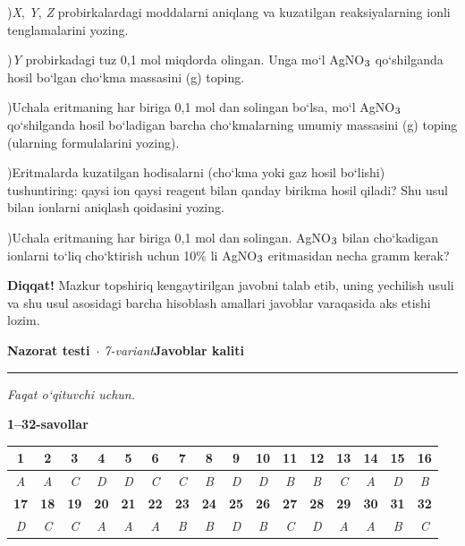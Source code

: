 \documentclass[11pt,a4paper]{article}
\renewcommand{\textsubscript}[1]{\ensuremath{_{\text{\fontsize{8}{8}\selectfont #1}}}}
\newcommand{\diqqat}[1]{\par\smallskip\noindent\textbf{Diqqat!} #1\par\medskip}
\begin{document}
)\textit{X}, \textit{Y}, \textit{Z} probirkalardagi moddalarni aniqlang va kuzatilgan reaksiyalarning ionli tenglamalarini yozing.\par
{})\textit{Y} probirkadagi tuz 0,1 mol miqdorda olingan. Unga mo`l AgNO\textsubscript{3} qo`shilganda hosil bo`lgan cho`kma massasini (g) toping.\par
{})Uchala eritmaning har biriga 0,1 mol dan solingan bo`lsa, mo`l AgNO\textsubscript{3} qo`shilganda hosil bo`ladigan barcha cho`kmalarning umumiy massasini (g) toping (ularning formulalarini yozing).\par
{})Eritmalarda kuzatilgan hodisalarni (cho`kma yoki gaz hosil bo`lishi) tushuntiring: qaysi ion qaysi reagent bilan qanday birikma hosil qiladi? Shu usul bilan ionlarni aniqlash qoidasini yozing.\par
{})Uchala eritmaning har biriga 0,1 mol dan solingan. AgNO\textsubscript{3} bilan cho`kadigan ionlarni to`liq cho`ktirish uchun 10\% li AgNO\textsubscript{3} eritmasidan necha gramm kerak?\par
\diqqat{Mazkur topshiriq kengaytirilgan javobni talab etib, uning yechilish usuli va shu usul asosidagi barcha hisoblash amallari javoblar varaqasida aks etishi lozim.}
\newpage
\noindent\textbf{\fontsize{13}{15}\selectfont Nazorat testi}\ \textit{$\cdot$ 7-variant}\hfill \textbf{Javoblar kaliti}\par\smallskip\hrule\smallskip
\textit{Faqat o`qituvchi uchun.}\par\medskip
\noindent\textbf{1--32-savollar}\par\smallskip
\noindent\begin{tabular}{|c|c|c|c|c|c|c|c|c|c|c|c|c|c|c|c|}\hline
\textbf{1} & \textbf{2} & \textbf{3} & \textbf{4} & \textbf{5} & \textbf{6} & \textbf{7} & \textbf{8} & \textbf{9} & \textbf{10} & \textbf{11} & \textbf{12} & \textbf{13} & \textbf{14} & \textbf{15} & \textbf{16}\\\hline
\textsl{A} & \textsl{A} & \textsl{C} & \textsl{D} & \textsl{D} & \textsl{C} & \textsl{C} & \textsl{B} & \textsl{D} & \textsl{D} & \textsl{B} & \textsl{B} & \textsl{C} & \textsl{A} & \textsl{D} & \textsl{B}\\\hline
\textbf{17} & \textbf{18} & \textbf{19} & \textbf{20} & \textbf{21} & \textbf{22} & \textbf{23} & \textbf{24} & \textbf{25} & \textbf{26} & \textbf{27} & \textbf{28} & \textbf{29} & \textbf{30} & \textbf{31} & \textbf{32}\\\hline
\textsl{D} & \textsl{C} & \textsl{C} & \textsl{A} & \textsl{A} & \textsl{A} & \textsl{B} & \textsl{B} & \textsl{D} & \textsl{B} & \textsl{C} & \textsl{D} & \textsl{A} & \textsl{A} & \textsl{B} & \textsl{C}\\\hline
\end{tabular}\par\medskip
\end{document}
